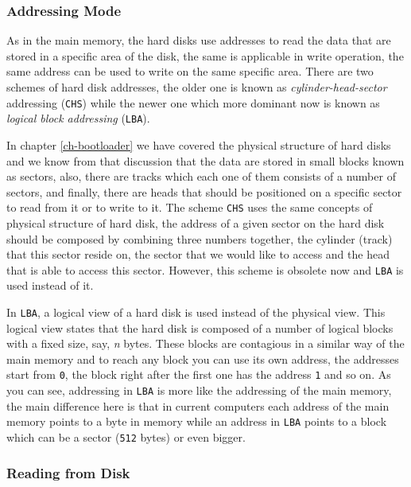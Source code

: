 \subsubsection{Addressing Mode}\label{addressing-mode}

As in the main memory, the hard disks use addresses to read the data
that are stored in a specific area of the disk, the same is applicable
in write operation, the same address can be used to write on the same
specific area. There are two schemes of hard disk addresses, the older
one is known as \emph{cylinder-head-sector} addressing (\lstinline!CHS!)
while the newer one which more dominant now is known as \emph{logical
block addressing} (\lstinline!LBA!).

In chapter \ref{ch-bootloader} we have covered the physical structure of
hard disks and we know from that discussion that the data are stored in
small blocks known as sectors, also, there are tracks which each one of
them consists of a number of sectors, and finally, there are heads that
should be positioned on a specific sector to read from it or to write to
it. The scheme \lstinline!CHS! uses the same concepts of physical
structure of hard disk, the address of a given sector on the hard disk
should be composed by combining three numbers together, the cylinder
(track) that this sector reside on, the sector that we would like to
access and the head that is able to access this sector. However, this
scheme is obsolete now and \lstinline!LBA! is used instead of it.

In \lstinline!LBA!, a logical view of a hard disk is used instead of the
physical view. This logical view states that the hard disk is composed
of a number of logical blocks with a fixed size, say, \emph{n} bytes.
These blocks are contagious in a similar way of the main memory and to
reach any block you can use its own address, the addresses start from
\lstinline!0!, the block right after the first one has the address
\lstinline!1! and so on. As you can see, addressing in \lstinline!LBA!
is more like the addressing of the main memory, the main difference here
is that in current computers each address of the main memory points to a
byte in memory while an address in \lstinline!LBA! points to a block
which can be a sector (\lstinline!512! bytes) or even bigger.

\subsubsection{Reading from Disk}\label{reading-from-disk}

